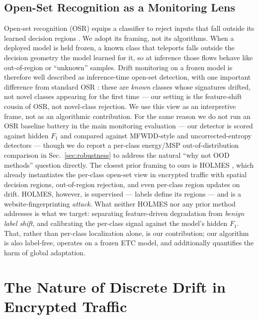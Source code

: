 \subsection{Open-Set Recognition as a Monitoring Lens}
\label{sec:related_osr}
Open-set recognition (OSR) equips a classifier to reject inputs that fall
outside its learned decision regions \cite{bendale2016openmax}. We adopt its
framing, not its algorithms. When a deployed model is held frozen, a known
class that teleports falls outside the decision geometry the model learned for
it, so at inference those flows behave like out-of-region or ``unknown''
samples. Drift monitoring on a frozen model is therefore well described as
inference-time open-set detection, with one important difference from standard
OSR \cite{geng2021osr}: these are \emph{known} classes whose signatures drifted,
not novel classes appearing for the first time --- our setting is the
feature-shift cousin of OSR, not novel-class rejection. We use this view as an
interpretive frame, not as an algorithmic contribution. For the same reason we do not run an OSR baseline
battery in the main monitoring evaluation --- our detector is scored against
hidden $F_1$ and compared against MFWDD-style and uncorrected-entropy detectors
--- though we do report a per-class energy/MSP out-of-distribution comparison in
Sec.~\ref{sec:robustness} to address the natural ``why not OOD methods'' question
directly. The closest prior framing to ours is HOLMES
\cite{deng2024holmes}, which already instantiates the per-class open-set view in
encrypted traffic with spatial decision regions, out-of-region rejection, and
even per-class region updates on drift. HOLMES, however, is supervised --- labels
define its regions --- and is a website-fingerprinting \emph{attack}. What
neither HOLMES nor any prior method addresses is what we target: separating
feature-driven degradation from \emph{benign label shift}, and calibrating the
per-class signal against the model's hidden $F_1$. That, rather than per-class
localization alone, is our contribution; our algorithm is also label-free, operates
on a frozen ETC model, and additionally quantifies the harm of global adaptation.

\section{The Nature of Discrete Drift in Encrypted Traffic}
\label{sec:discrete}

